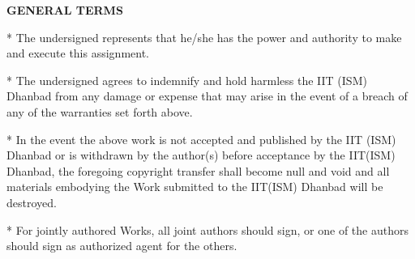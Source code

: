 \begin{minipage}{\textwidth}
	\fontsize{12pt}{0pt}\selectfont \textbf{GENERAL TERMS}
\end{minipage}

\begin{minipage}{\textwidth}
\fontsize{10pt}{0pt}\selectfont
*	The undersigned represents that he/she has the power and authority to make and execute this assignment.

\vspace{0.2cm}

*	The undersigned agrees to indemnify and hold harmless the IIT (ISM) Dhanbad from any damage or expense that may arise in the event of a breach of any of the warranties set forth above.

\vspace{0.2cm}

*	In the event the above work is not accepted and published by the IIT (ISM) Dhanbad or is withdrawn by the author(s) before acceptance by the IIT(ISM) Dhanbad, the foregoing copyright transfer shall become null and void and all materials embodying the Work submitted to the IIT(ISM) Dhanbad will be destroyed.

\vspace{0.2cm}

*	For jointly authored Works, all joint authors should sign, or one of the authors should sign as authorized agent for the others.
\end{minipage}

\begin{minipage}{\textwidth}
\vspace{7.00mm}
	\begin{flushright}
		\fontsize{12pt}{7pt}
	\end{flushright}
\end{minipage}
\vfill